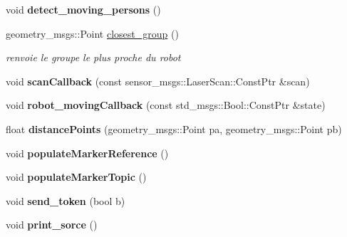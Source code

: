 \begin{DoxyCompactItemize}
\item 
void {\bfseries detect\+\_\+moving\+\_\+persons} ()\hypertarget{classmoving__persons__detector_af7e1bb275af1ca1a6a062d1162d4100e}{}\label{classmoving__persons__detector_af7e1bb275af1ca1a6a062d1162d4100e}

\item 
geometry\+\_\+msgs\+::\+Point \hyperlink{classmoving__persons__detector_a56e54848546290d3dd0c06956763ee30}{closest\+\_\+group} ()
\begin{DoxyCompactList}\small\item\em renvoie le groupe le plus proche du robot \end{DoxyCompactList}\item 
void {\bfseries scan\+Callback} (const sensor\+\_\+msgs\+::\+Laser\+Scan\+::\+Const\+Ptr \&scan)\hypertarget{classmoving__persons__detector_a598d9cca5f0b1a46b784a9f888ae850d}{}\label{classmoving__persons__detector_a598d9cca5f0b1a46b784a9f888ae850d}

\item 
void {\bfseries robot\+\_\+moving\+Callback} (const std\+\_\+msgs\+::\+Bool\+::\+Const\+Ptr \&state)\hypertarget{classmoving__persons__detector_abeba4f8d5ceb0a1b3d6033dc5747fb21}{}\label{classmoving__persons__detector_abeba4f8d5ceb0a1b3d6033dc5747fb21}

\item 
float {\bfseries distance\+Points} (geometry\+\_\+msgs\+::\+Point pa, geometry\+\_\+msgs\+::\+Point pb)\hypertarget{classmoving__persons__detector_aa48199ec508ad8deadbbc063bb0aeb5b}{}\label{classmoving__persons__detector_aa48199ec508ad8deadbbc063bb0aeb5b}

\item 
void {\bfseries populate\+Marker\+Reference} ()\hypertarget{classmoving__persons__detector_a77dddf81140f2bdac9d2e601ab300e67}{}\label{classmoving__persons__detector_a77dddf81140f2bdac9d2e601ab300e67}

\item 
void {\bfseries populate\+Marker\+Topic} ()\hypertarget{classmoving__persons__detector_ad91162912d72e16901b739eb8a4a8d93}{}\label{classmoving__persons__detector_ad91162912d72e16901b739eb8a4a8d93}

\item 
void {\bfseries send\+\_\+token} (bool b)\hypertarget{classmoving__persons__detector_a6859b1e4f51fbd7e39c325acddfb1b60}{}\label{classmoving__persons__detector_a6859b1e4f51fbd7e39c325acddfb1b60}

\item 
void {\bfseries print\+\_\+sorce} ()\hypertarget{classmoving__persons__detector_a361fe077962345d7cba41cd160d3d52a}{}\label{classmoving__persons__detector_a361fe077962345d7cba41cd160d3d52a}


\end{DoxyCompactItemize}
